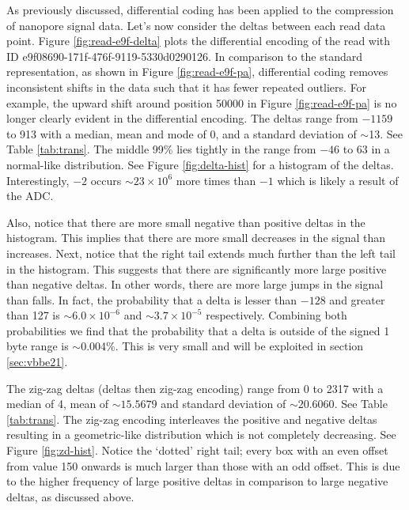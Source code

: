 As previously discussed, differential coding has been applied to the compression of nanopore signal data.
Let's now consider the deltas between each read data point. Figure \ref{fig:read-e9f-delta} plots the differential encoding of the read with ID e9f08690-171f-476f-9119-5330d0290126. In comparison to the standard representation, as shown in Figure \ref{fig:read-e9f-pa}, differential coding removes inconsistent shifts in the data such that it has fewer repeated outliers. For example, the upward shift around position 50000 in Figure \ref{fig:read-e9f-pa} is no longer clearly evident in the differential encoding.
The deltas range from $-1159$ to 913 with a median, mean and mode of 0, and a standard deviation of $\sim$13. See Table \ref{tab:trans}.
The middle 99\% lies tightly in the range from $-46$ to 63 in a normal-like distribution. See Figure \ref{fig:delta-hist} for a histogram of the deltas.
Interestingly, $-2$ occurs $\sim23\times 10^6$ more times than $-1$ which is likely a result of the ADC.

Also, notice that there are more small negative than positive deltas in the histogram. This implies that there are more small decreases in the signal than increases.
\label{subsec:prob}
Next, notice that the right tail extends much further than the left tail in the histogram. This suggests that there are significantly more large positive than negative deltas. In other words, there are more large jumps in the signal than falls.
In fact, the probability that a delta is lesser than $-128$ and greater than 127 is $\sim6.0\times 10^{-6}$ and $\sim3.7\times 10^{-5}$ respectively. Combining both probabilities we find that the probability that a delta is outside of the signed 1 byte range is $\sim$0.004\%. This is very small and will be exploited in section \ref{sec:vbbe21}.





The zig-zag deltas (deltas then zig-zag encoding) range from 0 to 2317 with a median of 4, mean of $\sim15.5679$ and standard deviation of $\sim20.6060$. See Table \ref{tab:trans}. The zig-zag encoding interleaves the positive and negative deltas resulting in a geometric-like distribution which is not completely decreasing. See Figure \ref{fig:zd-hist}. Notice the `dotted' right tail; every box with an even offset from value 150 onwards is much larger than those with an odd offset. This is due to the higher frequency of large positive deltas in comparison to large negative deltas, as discussed above.
\label{subsec:stripe}

